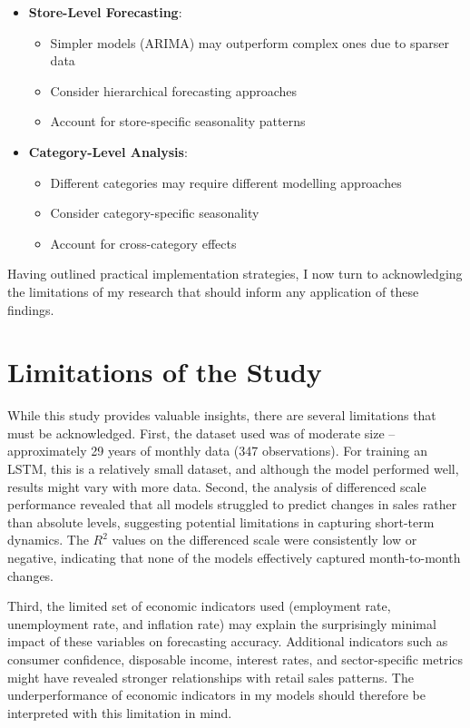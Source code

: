 \documentclass[12pt,a4paper]{report}
\begin{document}
\begin{itemize}
    \item \textbf{Store-Level Forecasting}:
    \begin{itemize}
        \item Simpler models (ARIMA) may outperform complex ones due to sparser data
        \item Consider hierarchical forecasting approaches
        \item Account for store-specific seasonality patterns
    \end{itemize}
    
    \item \textbf{Category-Level Analysis}:
    \begin{itemize}
        \item Different categories may require different modelling approaches
        \item Consider category-specific seasonality
        \item Account for cross-category effects
    \end{itemize}
\end{itemize}

Having outlined practical implementation strategies, I now turn to acknowledging the limitations of my research that should inform any application of these findings.

\section{Limitations of the Study}

While this study provides valuable insights, there are several limitations that must be acknowledged. First, the dataset used was of moderate size – approximately 29 years of monthly data (347 observations). For training an LSTM, this is a relatively small dataset, and although the model performed well, results might vary with more data. Second, the analysis of differenced scale performance revealed that all models struggled to predict changes in sales rather than absolute levels, suggesting potential limitations in capturing short-term dynamics. The $R^2$ values on the differenced scale were consistently low or negative, indicating that none of the models effectively captured month-to-month changes. 

Third, the limited set of economic indicators used (employment rate, unemployment rate, and inflation rate) may explain the surprisingly minimal impact of these variables on forecasting accuracy. Additional indicators such as consumer confidence, disposable income, interest rates, and sector-specific metrics might have revealed stronger relationships with retail sales patterns. The underperformance of economic indicators in my models should therefore be interpreted with this limitation in mind.
\end{document}
